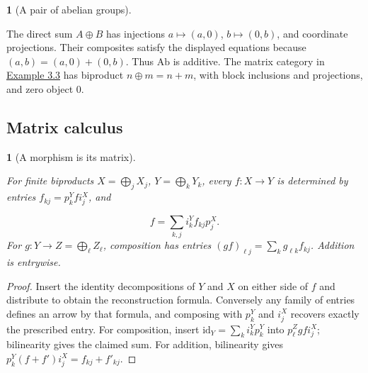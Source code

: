 \documentclass[11pt,a4paper]{article}
\newcommand{\mathheading}{}
\theoremstyle{plain}
\newtheorem*{plainstatement}{\mathheading}
\theoremstyle{definition}
\newtheorem*{definitionstatement}{\mathheading}
\newenvironment{mathstatement}[3]{\renewcommand{\mathheading}{#1 #2}\begin{plainstatement}[#3]}{\end{plainstatement}}
\newenvironment{mathdefinition}[3]{\renewcommand{\mathheading}{#1 #2}\begin{definitionstatement}[#3]}{\end{definitionstatement}}
\begin{document}
\begin{mathdefinition}{Example}{3.6}{A pair of abelian groups}
\label{env-3-6}

The direct sum \(A\oplus B\) has injections \(a\mapsto(a,0)\), \(b\mapsto(0,b)\), and coordinate projections. Their composites satisfy the displayed equations because \((a,b)=(a,0)+(0,b)\). Thus \(\mathrm{Ab}\) is additive. The matrix category in \hyperref[env-3-3]{Example 3.3} has biproduct \(n\oplus m=n+m\), with block inclusions and projections, and zero object \(0\).


\par{}\par

\end{mathdefinition}
 
\subsection{Matrix calculus}

\begin{mathstatement}{Proposition}{3.7}{A morphism is its matrix}
\label{env-3-7}

For finite biproducts \(X=\bigoplus_jX_j\), \(Y=\bigoplus_kY_k\), every \(f:X\to Y\) is determined by entries \(f_{kj}=p^Y_k f i^X_j\), and

\[f=\sum_{k,j}i^Y_k f_{kj}p^X_j.\] 
For \(g:Y\to Z=\bigoplus_\ell Z_\ell\), composition has entries \((gf)_{\ell j}=\sum_k g_{\ell k}f_{kj}\). Addition is entrywise.


\par{}\par

\end{mathstatement}
 
\begin{proof}

Insert the identity decompositions of \(Y\) and \(X\) on either side of \(f\) and distribute to obtain the reconstruction formula. Conversely any family of entries defines an arrow by that formula, and composing with \(p^Y_k\) and \(i^X_j\) recovers exactly the prescribed entry. For composition, insert \(\mathrm{id}_Y=\sum_k i^Y_kp^Y_k\) into \(p^Z_\ell gf i^X_j\); bilinearity gives the claimed sum. For addition, bilinearity gives \(p^Y_k(f+f')i^X_j=f_{kj}+f'_{kj}\).


\end{proof}
 
\end{document}
